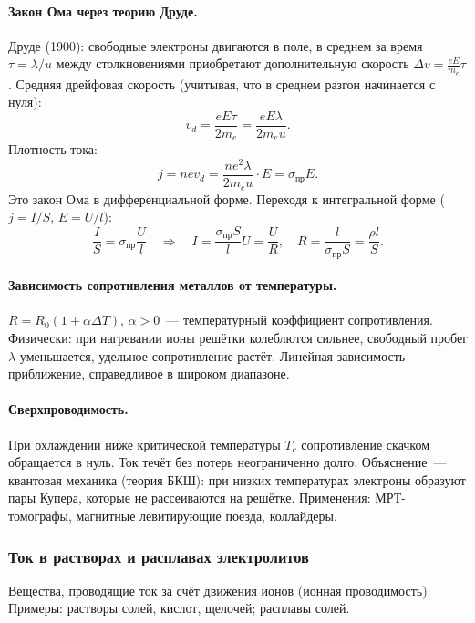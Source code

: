 \documentclass[12pt]{article}
\begin{document}
\paragraph{Закон Ома через теорию Друде.}
Друде (1900): свободные электроны двигаются в поле, в среднем за время $\tau = \lambda / u$ между столкновениями приобретают дополнительную скорость $\Delta v = \frac{eE}{m_e}\tau$. Средняя дрейфовая скорость (учитывая, что в среднем разгон начинается с нуля):
\[
	v_d = \frac{eE\tau}{2m_e} = \frac{eE\lambda}{2m_e u}.
\]
Плотность тока:
\[
	j = nev_d = \frac{ne^2\lambda}{2m_e u} \cdot E = \sigma_{\text{пр}} E.
\]
Это закон Ома в дифференциальной форме. Переходя к интегральной форме ($j = I/S$, $E = U/l$):
\[
	\frac{I}{S} = \sigma_{\text{пр}} \frac{U}{l} \quad \Longrightarrow \quad I = \frac{\sigma_{\text{пр}} S}{l} U = \frac{U}{R}, \quad R = \frac{l}{\sigma_{\text{пр}} S} = \frac{\rho l}{S}.
\]

\paragraph{Зависимость сопротивления металлов от температуры.}
$R = R_0(1 + \alpha \Delta T)$, $\alpha > 0$~--- температурный коэффициент сопротивления. Физически: при нагревании ионы решётки колеблются сильнее, свободный пробег $\lambda$ уменьшается, удельное сопротивление растёт. Линейная зависимость~--- приближение, справедливое в широком диапазоне.

\paragraph{Сверхпроводимость.}
При охлаждении ниже критической температуры $T_c$ сопротивление скачком обращается в нуль. Ток течёт без потерь неограниченно долго. Объяснение~--- квантовая механика (теория БКШ): при низких температурах электроны образуют пары Купера, которые не рассеиваются на решётке. Применения: МРТ-томографы, магнитные левитирующие поезда, коллайдеры.

\subsubsection{Ток в растворах и расплавах электролитов}

\begin{definition}[Электролиты]
	Вещества, проводящие ток за счёт движения ионов (ионная проводимость). Примеры: растворы солей, кислот, щелочей; расплавы солей.
\end{definition}
\end{document}
